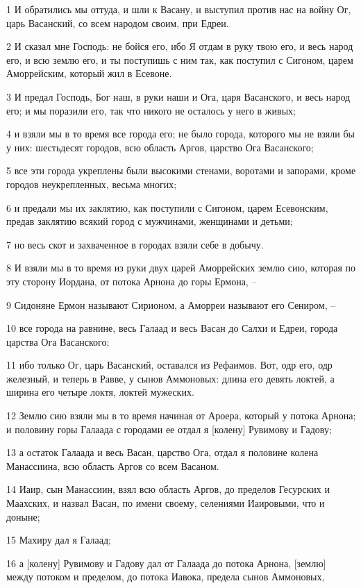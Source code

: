 \par 1 И обратились мы оттуда, и шли к Васану, и выступил против нас на войну Ог, царь Васанский, со всем народом своим, при Едреи.
\par 2 И сказал мне Господь: не бойся его, ибо Я отдам в руку твою его, и весь народ его, и всю землю его, и ты поступишь с ним так, как поступил с Сигоном, царем Аморрейским, который жил в Есевоне.
\par 3 И предал Господь, Бог наш, в руки наши и Ога, царя Васанского, и весь народ его; и мы поразили его, так что никого не осталось у него в живых;
\par 4 и взяли мы в то время все города его; не было города, которого мы не взяли бы у них: шестьдесят городов, всю область Аргов, царство Ога Васанского;
\par 5 все эти города укреплены были высокими стенами, воротами и запорами, кроме городов неукрепленных, весьма многих;
\par 6 и предали мы их заклятию, как поступили с Сигоном, царем Есевонским, предав заклятию всякий город с мужчинами, женщинами и детьми;
\par 7 но весь скот и захваченное в городах взяли себе в добычу.
\par 8 И взяли мы в то время из руки двух царей Аморрейских землю сию, которая по эту сторону Иордана, от потока Арнона до горы Ермона, --
\par 9 Сидоняне Ермон называют Сирионом, а Аморреи называют его Сениром, --
\par 10 все города на равнине, весь Галаад и весь Васан до Салхи и Едреи, города царства Ога Васанского;
\par 11 ибо только Ог, царь Васанский, оставался из Рефаимов. Вот, одр его, одр железный, и теперь в Равве, у сынов Аммоновых: длина его девять локтей, а ширина его четыре локтя, локтей мужеских.
\par 12 Землю сию взяли мы в то время начиная от Ароера, который у потока Арнона; и половину горы Галаада с городами ее отдал я [колену] Рувимову и Гадову;
\par 13 а остаток Галаада и весь Васан, царство Ога, отдал я половине колена Манассиина, всю область Аргов со всем Васаном.
\par 14 Иаир, сын Манассиин, взял всю область Аргов, до пределов Гесурских и Маахских, и назвал Васан, по имени своему, селениями Иаировыми, что и доныне;
\par 15 Махиру дал я Галаад;
\par 16 а [колену] Рувимову и Гадову дал от Галаада до потока Арнона, [землю] между потоком и пределом, до потока Иавока, предела сынов Аммоновых,
